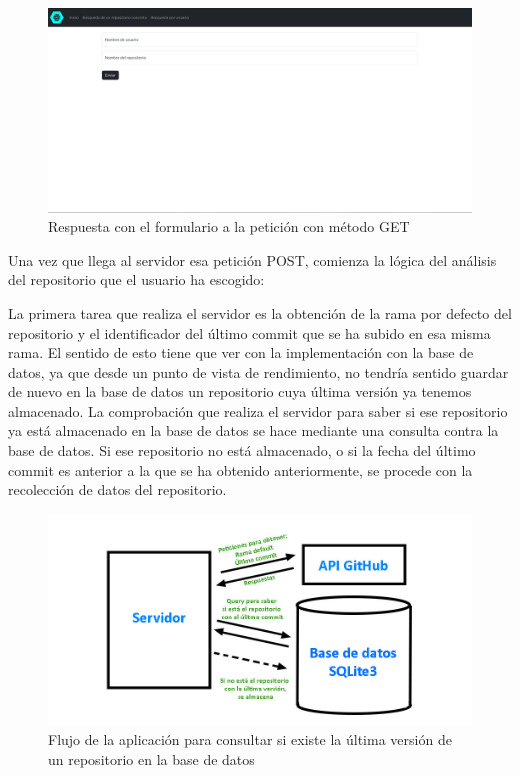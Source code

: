 \documentclass[a4paper, 12pt]{book}
\begin{document}
\begin{figure}[H]
  \centering
  \includegraphics[width=1\textwidth]{img/userrepoget.png}
  \caption{Respuesta con el formulario a la petición con método GET}
  \label{figura:userrepoget}
\end{figure}
Una vez que llega al servidor esa petición POST, comienza la lógica del análisis del repositorio que el usuario ha escogido:

La primera tarea que realiza el servidor es la obtención de la rama por defecto del repositorio y el identificador del último commit que se ha subido en esa misma rama. El sentido de esto tiene que ver con la implementación con la base de datos, ya que desde un punto de vista de rendimiento, no tendría sentido guardar de nuevo en la base de datos un repositorio cuya última versión ya tenemos almacenado. La comprobación que realiza el servidor para saber si ese repositorio ya está almacenado en la base de datos se hace mediante una consulta contra la base de datos. Si ese repositorio no está almacenado, o si la fecha del último commit es anterior a la que se ha obtenido anteriormente, se procede con la recolección de datos del repositorio.

\begin{figure}[H]
  \centering
  \includegraphics[width=1\textwidth]{img/flujo1.jpg}
  \caption{Flujo de la aplicación para consultar si existe la última versión de un repositorio en la base de datos}
  \label{figura:flujoconsulta}
\end{figure}
\end{document}
